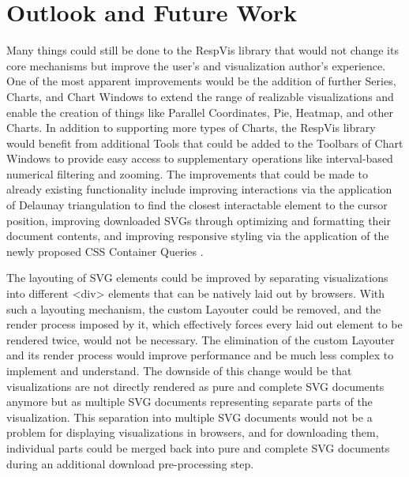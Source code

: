 \chapter{Outlook and Future Work}
\label{chap:Outlook}

Many things could still be done to the RespVis library that would not change its core mechanisms but improve the user's and visualization author's experience.
One of the most apparent improvements would be the addition of further Series, Charts, and Chart Windows to extend the range of realizable visualizations and enable the creation of things like Parallel Coordinates, Pie, Heatmap, and other Charts.
In addition to supporting more types of Charts, the RespVis library would benefit from additional Tools that could be added to the Toolbars of Chart Windows to provide easy access to supplementary operations like interval-based numerical filtering and zooming.
The improvements that could be made to already existing functionality include improving interactions via the application of Delaunay triangulation \parencite{Delaunay, DelaunayAlgorithms} to find the closest interactable element to the cursor position, improving downloaded SVGs through optimizing and formatting their document contents, and improving responsive styling via the application of the newly proposed CSS Container Queries \parencite{CSSContainment3}. 

The layouting of SVG elements could be improved by separating visualizations into different <div> elements that can be natively laid out by browsers.
With such a layouting mechanism, the custom Layouter could be removed, and the render process imposed by it, which effectively forces every laid out element to be rendered twice, would not be necessary.
The elimination of the custom Layouter and its render process would improve performance and be much less complex to implement and understand.
The downside of this change would be that visualizations are not directly rendered as pure and complete SVG documents anymore but as multiple SVG documents representing separate parts of the visualization.
This separation into multiple SVG documents would not be a problem for displaying visualizations in browsers, and for downloading them, individual parts could be merged back into pure and complete SVG documents during an additional download pre-processing step.

